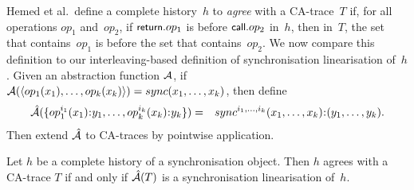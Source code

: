 Hemed et al.~define a complete history~$h$ to \emph{agree} with a CA-trace~$T$
if, for all operations $op_1$ and~$op_2$, if $\mbox{\sf{\small return}}.op_1$ is before
$\mbox{\sf{\small call}}.op_2$ in~$h$, then in~$T$, the set that contains~$op_1$ is before the
set that contains~$op_2$.  We now compare this definition to our
interleaving-based definition of synchronisation linearisation of~$h$.
%
Given an abstraction function $\mathcal{A}$, if $\mathcal{A}(\langle op_1(x_1), \ldots, op_k(x_k)
 \rangle) = sync(x_1,\ldots,x_k)$, then define
\begin{eqnarray*}
\hat\A(\set{ op_1^{i_1}(x_1)\::y_1, \ldots, op_k^{i_k}(x_k)\::y_k }) & = &
  sync^{i_1,\ldots,i_k}(x_1,\ldots,x_k)\::(y_1, \ldots, y_k).
\end{eqnarray*}
Then extend $\hat{\mathcal{A}}$ to CA-traces by pointwise application.
%
\begin{lemma}
\label{lem:CA-traces}
Let $h$ be a complete history of a synchronisation object.  Then $h$ agrees
with a CA-trace $T$ if and only if $\hat{\mathcal{A}}(T)$ is a synchronisation
linearisation of~$h$. 
\end{lemma}
%
